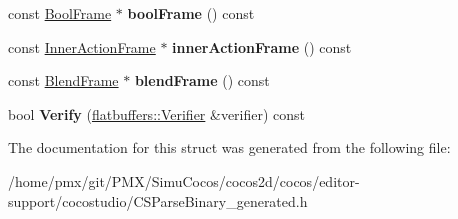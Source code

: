 \begin{DoxyCompactItemize}
const \hyperlink{structflatbuffers_1_1BoolFrame}{Bool\+Frame} $\ast$ {\bfseries bool\+Frame} () const
\item 
\mbox{\label{structflatbuffers_1_1Frame_abf1f60a23416fdcb3f9396b7848e0f3e}} 
const \hyperlink{structflatbuffers_1_1InnerActionFrame}{Inner\+Action\+Frame} $\ast$ {\bfseries inner\+Action\+Frame} () const
\item 
\mbox{\label{structflatbuffers_1_1Frame_a926954498a2d2b1e0ecc747d18fdfafd}} 
const \hyperlink{structflatbuffers_1_1BlendFrame}{Blend\+Frame} $\ast$ {\bfseries blend\+Frame} () const
\item 
\mbox{\label{structflatbuffers_1_1Frame_a8e598b0e96eb3f4249a0e405de227fce}} 
bool {\bfseries Verify} (\hyperlink{classflatbuffers_1_1Verifier}{flatbuffers\+::\+Verifier} \&verifier) const
\end{DoxyCompactItemize}


The documentation for this struct was generated from the following file\+:\begin{DoxyCompactItemize}
\item 
/home/pmx/git/\+P\+M\+X/\+Simu\+Cocos/cocos2d/cocos/editor-\/support/cocostudio/C\+S\+Parse\+Binary\+\_\+generated.\+h\end{DoxyCompactItemize}
